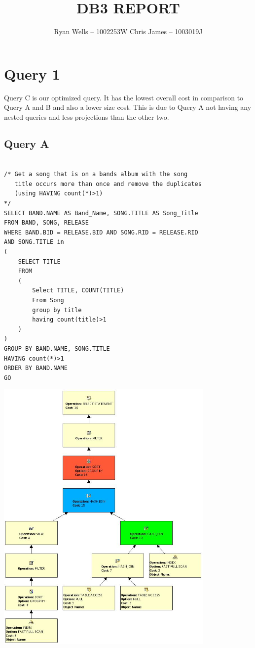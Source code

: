 \documentclass{report}
\title{DB3 REPORT}
\author{Ryan Wells -- 1002253W \n Chris James -- 1003019J}
\begin{document}
\maketitle
\newpage

\section*{Query 1}
Query C is our optimized query. It has the lowest overall cost in
comparison to Query A and B and also a lower size cost. This is due to
Query A not having any nested queries and less projections than the
other two. \\
\subsection*{Query A}
\begin{verbatim}

/* Get a song that is on a bands album with the song 
   title occurs more than once and remove the duplicates
   (using HAVING count(*)>1) 
*/
SELECT BAND.NAME AS Band_Name, SONG.TITLE AS Song_Title
FROM BAND, SONG, RELEASE 
WHERE BAND.BID = RELEASE.BID AND SONG.RID = RELEASE.RID 
AND SONG.TITLE in
(
    SELECT TITLE
    FROM
    (
        Select TITLE, COUNT(TITLE)
        From Song 
        group by title
        having count(title)>1
    )
)
GROUP BY BAND.NAME, SONG.TITLE
HAVING count(*)>1
ORDER BY BAND.NAME
GO
\end{verbatim}
\includegraphics[width=0.8\textwidth]{Q1A}
\end{document}
